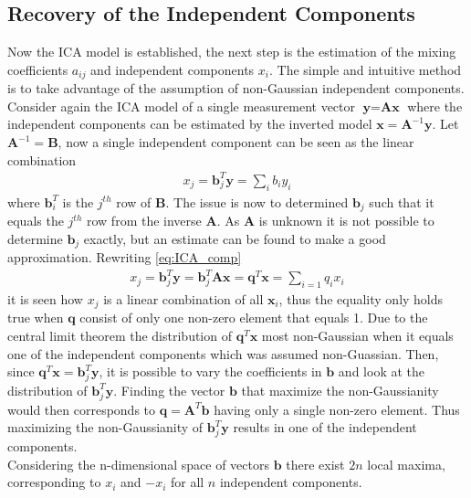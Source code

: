 \subsection{Recovery of the Independent Components}\label{sec:est_ica}
Now the ICA model is established, the next step is the estimation of the mixing coefficients $a_{ij}$ and independent components $x_i$. The simple and intuitive method is to take advantage of the assumption of non-Gaussian independent components. Consider again the ICA model of a single measurement vector $\textbf{y}=\textbf{Ax}$ where the independent components can be estimated by the inverted model $\textbf{x}=\textbf{A}^{-1}\textbf{y}$. Let $\textbf{A}^{-1}=\textbf{B}$, now a single independent component can be seen as the linear combination 
\begin{align}
x_j = \textbf{b}_{j}^T \textbf{y} = \sum_{i}b_iy_i \label{eq:ICA_comp}
\end{align} 
where $\textbf{b}_{i}^T$ is the $j^{th}$ row of $\textbf{B}$. The issue is now to determined $\textbf{b}_j$ such that it equals the $j^{th}$ row from the inverse $\textbf{A}$. As $\textbf{A}$ is unknown it is not possible to determine $\textbf{b}_j$ exactly, but an estimate can be found to make a good approximation. Rewriting \eqref{eq:ICA_comp} 
\begin{align*}
x_j = \textbf{b}_{j}^T \textbf{y} = \textbf{b}_{j}^T \textbf{Ax} = \textbf{q}^T\textbf{x} = \sum_{i=1}q_i x_i
\end{align*}
it is seen how $x_j$ is a linear combination of all $\textbf{x}_i$, thus the equality only holds true when $\textbf{q}$ consist of only one non-zero element that equals 1.  
Due to the central limit theorem the distribution of $\textbf{q}^T\textbf{x}$ most non-Gaussian when it equals one of the independent components which was assumed non-Guassian. Then, since $\textbf{q}^T\textbf{x} = \textbf{b}_{j}^T \textbf{y}$, it is possible to vary the coefficients in $\textbf{b}$ and look at the distribution of $\textbf{b}_{j}^T \textbf{y}$. Finding the vector $\textbf{b}$ that maximize the non-Gaussianity would then corresponds to $\textbf{q}=\textbf{A}^T\textbf{b}$ having only a single non-zero element. Thus maximizing the non-Gaussianity of $\textbf{b}_{j}^T \textbf{y}$ results in one of the independent components\cite[p. 166]{ICA}. \\
Considering the n-dimensional space of vectors $\textbf{b}$ there exist $2n$ local maxima, corresponding to $x_i$ and $-x_i$ for all $n$ independent components\cite[p. 166]{ICA}. 

